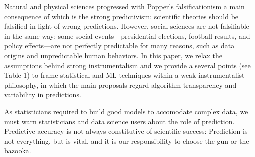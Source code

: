\documentclass{statsoc}
\begin{document}
Natural and physical sciences progressed with Popper's falsificationism  a main consequence of which is the 
strong predictivism: scientific theories should be falsified in light of wrong predictions. However, social sciences are not falsifiable in the 
same way: some social events---presidential elections, football results, and policy effects---are not perfectly predictable for many reasons, such 
as data origins and unpredictable human behaviors. In this paper, we relax the assumptions behind strong instrumentalism and we provide a 
several points (see Table 1) to frame statistical and ML techniques within a weak instrumentalist philosophy, in which the main 
proposals regard algorithm transparency and variability in predictions.

As statisticians required to build good models to accomodate complex data, we must warn statisticians and data science users about the role of prediction. Predictive accuracy is not always constitutive of scientific success: Prediction is not everything, but is vital, and it is our responsibility to choose the gun or the bazooka.





\end{document}
